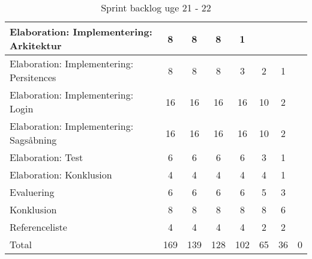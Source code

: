 \documentclass[../main.tex]{subfiles}
\begin{document}
\begin{center}
\begin{table}[H]
{\begin{tabular}{| l | c | c | c | c | c | c | c |}
    Elaboration: Implementering: Arkitektur 	        		     & 8 & 8 & 8 & 1 &  & & \\ \hline
    Elaboration: Implementering: Persitences 	        		     & 8 & 8 & 8 & 3 & 2 & 1 & \\ \hline
    Elaboration: Implementering: Login 	        		     		 & 16 & 16 & 16 & 16 & 10 & 2 & \\ \hline
    Elaboration: Implementering: Sagsåbning 	        		     & 16 & 16 & 16 & 16 & 10 & 2 & \\ \hline
    Elaboration: Test												 & 6 & 6 & 6 & 6 & 3 & 1 & \\ \hline
    Elaboration: Konklusion										 	 & 4 & 4 & 4 & 4 & 4 & 1 & \\ \hline
    Evaluering										 	 		 	 & 6 & 6 & 6 & 6 & 5 & 3 & \\ \hline
    Konklusion														 & 8 & 8 & 8 & 8 & 8 & 6 & \\ \hline
    Referenceliste													 & 4 & 4 & 4 & 4 & 2 & 2 & \\ \hline
    Total                                 							 & 169 & 139 & 128 & 102 & 65 & 36 & 0 \\ \hline
    \end{tabular}}
    \caption{Sprint backlog uge 21 - 22}
    \label{tab:sprint_backlog_21_22}
\end{table}
\end{center}
\end{document}
